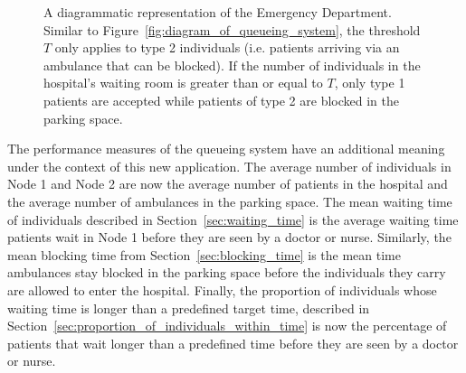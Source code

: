 \begin{figure}[H]
    \centering
    
    \caption{A diagrammatic representation of the Emergency Department.
    Similar to Figure~\ref{fig:diagram_of_queueing_system}, the threshold \(T\)
    only applies to type 2 individuals (i.e. patients arriving via an ambulance
    that can be blocked).
    If the number of individuals in the hospital's waiting room is greater than
    or equal to \(T\), only type 1 patients are accepted while patients of type
    2 are blocked in the parking space.}
    \label{fig:diagram_of_queueing_system_applied_to_ed_ems}
\end{figure}


The performance measures of the queueing system
have an additional meaning under the context of this new application.
The average number of individuals in Node 1 and Node 2 are now the average
number of patients in the hospital and the average number of ambulances in the
parking space.
The mean waiting time of individuals described in Section~\ref{sec:waiting_time}
is the average waiting time patients wait in Node 1 before they are seen by a
doctor or nurse.
Similarly, the mean blocking time from Section~\ref{sec:blocking_time}
is the mean time ambulances stay blocked in the parking space before the
individuals they carry are allowed to enter the hospital.
Finally, the proportion of individuals whose waiting time is longer than a
predefined target time, described in
Section~\ref{sec:proportion_of_individuals_within_time}
is now the percentage of patients that wait longer than a predefined time
before they are seen by a doctor or nurse.